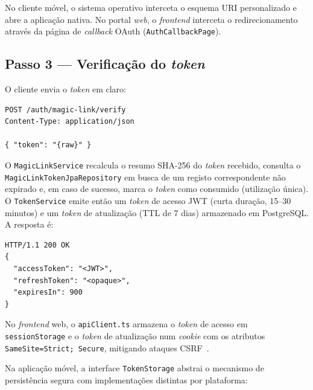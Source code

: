 No cliente móvel, o sistema operativo interceta o esquema URI personalizado
e abre a aplicação nativa.
No portal \textit{web}, o \textit{frontend} interceta o redirecionamento
através da página de \textit{callback} OAuth (\texttt{AuthCallbackPage}).

\subsection*{Passo 3 — Verificação do \textit{token}}

O cliente envia o \textit{token} em claro:

\begin{verbatim}
POST /auth/magic-link/verify
Content-Type: application/json

{ "token": "{raw}" }
\end{verbatim}

O \texttt{MagicLinkService} recalcula o resumo SHA-256 do \textit{token}
recebido, consulta o \texttt{MagicLinkTokenJpaRepository} em busca de um
registo correspondente não expirado e, em caso de sucesso, marca o
\textit{token} como consumido (utilização única).
O \texttt{TokenService} emite então um \textit{token} de acesso JWT
(curta duração, 15--30 minutos) e um \textit{token} de atualização
(TTL de 7 dias) armazenado em PostgreSQL.
A resposta é:

\begin{verbatim}
HTTP/1.1 200 OK
{
  "accessToken": "<JWT>",
  "refreshToken": "<opaque>",
  "expiresIn": 900
}
\end{verbatim}

No \textit{frontend} web, o \texttt{apiClient.ts} armazena o \textit{token}
de acesso em \texttt{sessionStorage} e o \textit{token} de atualização
num \textit{cookie} com os atributos
\texttt{SameSite=Strict; Secure}, mitigando ataques
CSRF~\cite{owasp2021a01,west2016samesite}.

Na aplicação móvel, a interface \texttt{TokenStorage} abstrai o mecanismo
de persistência segura com implementações distintas por plataforma:

